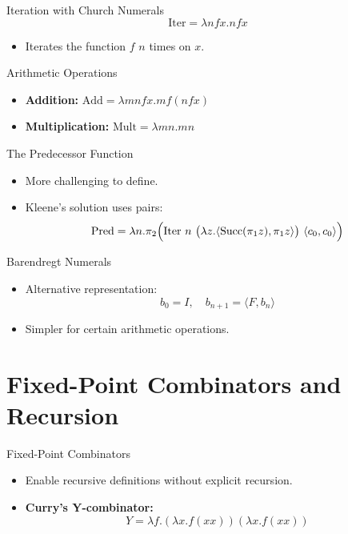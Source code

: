 \documentclass{beamer}
\begin{document}
\begin{frame}{Iteration with Church Numerals}
  \[
    \text{Iter} = \lambda nfx. n f x
  \]
  \begin{itemize}
    \item Iterates the function \(f\) \(n\) times on \(x\).
  \end{itemize}
\end{frame}

\begin{frame}{Arithmetic Operations}
  \begin{itemize}
    \item \textbf{Addition:} \( \text{Add} = \lambda m n f x. m f (n f x) \)
    \item \textbf{Multiplication:} \( \text{Mult} = \lambda m n. m n \)
  \end{itemize}
\end{frame}

\begin{frame}{The Predecessor Function}
  \begin{itemize}
    \item More challenging to define.
    \item Kleene’s solution uses pairs:
      \[
      \text{Pred} = \lambda n. \pi_2 \Bigl( \text{Iter}\ n\ \bigl(\lambda z. \langle \text{Succ}(\pi_1 z),\pi_1 z \rangle\bigr)\ \langle c_0, c_0 \rangle \Bigr)
      \]
  \end{itemize}
\end{frame}

\begin{frame}{Barendregt Numerals}
  \begin{itemize}
    \item Alternative representation: 
      \[
      b_0 = I,\quad b_{n+1} = \langle F, b_n \rangle
      \]
    \item Simpler for certain arithmetic operations.
  \end{itemize}
\end{frame}

\section{Fixed-Point Combinators and Recursion}
\begin{frame}{Fixed-Point Combinators}
  \begin{itemize}
    \item Enable recursive definitions without explicit recursion.
    \item \textbf{Curry's Y-combinator:}
      \[
      Y = \lambda f. (\lambda x. f (x x)) (\lambda x. f (x x))
      \]
  \end{itemize}
\end{frame}
\end{document}
